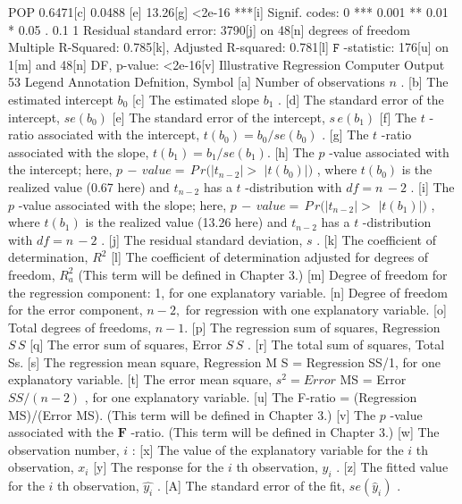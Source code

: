 \documentclass[11pt]{article}
\begin{document}
POP 0.6471[c] 0.0488 [e] 13.26[g] <2e-16 ***[i]
Signif. codes: 0 *** 0.001 ** 0.01 * 0.05 . 0.1 1
Residual standard error: 3790[j] on 48[n] degrees of freedom
Multiple R-Squared: 0.785[k], Adjusted R-squared: 0.781[l]
\(\mathtt{F}\) -statistic: 176[u] on 1[m] and 48[n] DF, p-value: <2e-16[v]
 Illustrative Regression Computer Output 53
Legend Annotation Defnition, Symbol
[a] Number of observations \(n\) .
[b] The estimated intercept \(b_{0}\)
[c] The estimated slope \(b_{1}\) .
[d] The standard error of the intercept, \(s e ( b_{0} )\)
[e] The standard error of the intercept, \(s \, e ( b_{1} )\)
[f] The \(t\) -ratio associated with the intercept, \(t ( b_{0} )=b_{0} / s e ( b_{0} )\) .
[g] The \(t\) -ratio associated with the slope, \(t ( b_{1} )=b_{1} / s e ( b_{1} ) .\)
[h] The \(p\) -value associated with the intercept; here, \(p \,-\, v a l u e=\, P \, r ( | t_{n-2} | >\)
\(\left| t ( b_{0} ) \right| )\) , where \(t ( b_{0} )\) is the realized value (0.67 here) and \(t_{n-2}\) has a
\(t\) -distribution with \(d f=n \,-2\) .
[i] The \(p\) -value associated with the slope; here, \(p \,-\, v a l u e=\, P \, r ( | t_{n-2} | >\)
\(\left| t ( b_{1} ) \right| )\) , where \(t ( b_{1} )\) is the realized value (13.26 here) and \(t_{n-2}\) has a
\(t\) -distribution with \(d f=n \,-2\) .
[j] The residual standard deviation, \(s\) .
[k] The coefficient of determination, \(R^{2}\)
[l] The coefficient of determination adjusted for degrees of freedom, \(R_{a}^{2}\) (This
term will be defined in Chapter 3.)
[m] Degree of freedom for the regression component: 1, for one explanatory
variable.
[n] Degree of freedom for the error component, \(n-2 ,\) for regression with one
 explanatory variable.
[o] Total degrees of freedoms, \(n-1 .\)
[p] The regression sum of squares, Regression \(S \, S\)
[q] The error sum of squares, Error \(S \, S\) .
[r] The total sum of squares, Total Ss.
[s] The regression mean square, Regression M S = Regression SS/1, for one
 explanatory variable.
[t] The error mean square, \(s^{2}=E r r o r\) MS = Error \(S S / ( n-2 )\) , for one
 explanatory variable.
[u] The F-ratio = (Regression MS)/(Error MS). (This term will be defined
 in Chapter 3.)
[v] The \(p\) -value associated with the \(\boldsymbol{F}\) -ratio. (This term will be defined in
Chapter 3.)
[w] The observation number, \(i\) :
[x] The value of the explanatory variable for the \(i\) th observation, \(x_{i}\)
[y] The response for the \(i\) th observation, \(y_{i}\) .
[z] The fitted value for the \(i\) th observation, \(\widehat{y_{i}}\) .
[A] The standard error of the fit, \(s e ( \widehat{y}_{i} )\) .
\end{document}

